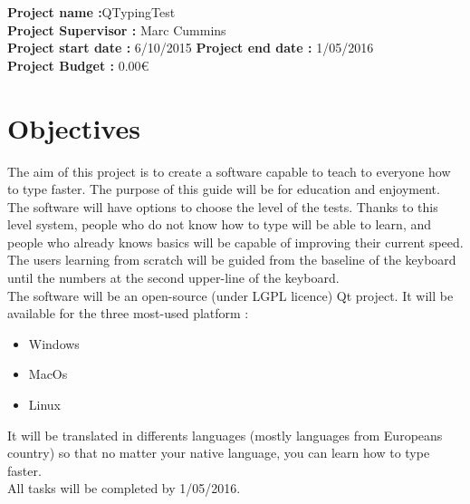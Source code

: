 
\textbf{Project name :}QTypingTest \\
\textbf{Project Supervisor :} Marc Cummins \\
\textbf{Project start date : } 6/10/2015
\textbf{Project end date : }1/05/2016 \\
\textbf{Project Budget :} 0.00€ \\

\chapter{Objectives}
The aim of this project is to create a software capable to teach to everyone how to type faster.
The purpose of this guide will be for education and enjoyment.\\
The software will have options to choose the level of the tests. Thanks to this level system, people who do not know how to type will be able to learn, and people who already knows basics will be capable of improving their current speed.\\
The users learning from scratch will be guided from the baseline of the keyboard until the numbers at the second upper-line of the keyboard.\\
The software will be an open-source (under LGPL licence) Qt project. It will be available for the three most-used platform : 
\begin{itemize}
	\item Windows
	\item MacOs
	\item Linux
\end{itemize}
 It will be translated in differents
languages (mostly languages from Europeans country) so that no matter your native language, you can learn how to type faster.\\
All tasks will be completed by 1/05/2016.

